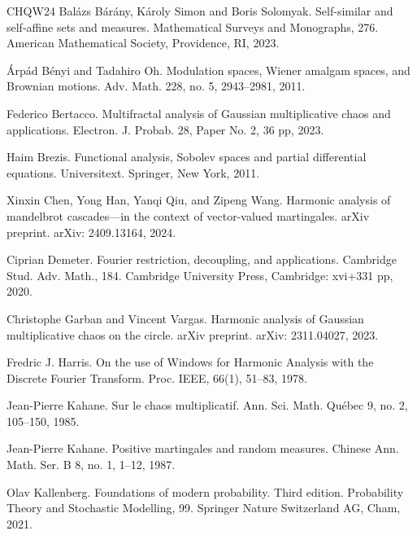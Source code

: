 \documentclass[12pt]{amsart}
\theoremstyle{definition}
\theoremstyle{remark}
\numberwithin{equation}{section}
\begin{document}
\newcommand{\etalchar}[1]{$^{#1}$}
\begin{thebibliography}{CHQW24}
	Bal\'azs B\'ar\'any, K\'aroly Simon and Boris Solomyak.
	\newblock Self-similar and self-affine sets and measures.
	\newblock  Mathematical Surveys and Monographs, 276. American Mathematical Society, Providence, RI, 2023.
	
	\'Arp\'ad B\'enyi and Tadahiro Oh.
	\newblock Modulation spaces, Wiener amalgam spaces, and Brownian motions.
	\newblock Adv. Math. 228, no. 5, 2943--2981, 2011.
	
	
	 Federico Bertacco.
	\newblock Multifractal analysis of Gaussian multiplicative chaos and applications. 
	\newblock Electron. J. Probab. 28, Paper No. 2, 36 pp, 2023.
	 
	Haim Brezis.
	\newblock Functional analysis, Sobolev spaces and partial differential equations.
	\newblock Universitext. Springer, New York, 2011.
	
	Xinxin Chen, Yong Han, Yanqi Qiu, and Zipeng Wang.
	\newblock Harmonic analysis of mandelbrot cascades---in the context of vector-valued martingales.
	\newblock arXiv preprint. arXiv: 2409.13164, 2024.
		
	Ciprian Demeter.
	\newblock Fourier restriction, decoupling, and applications.
	\newblock Cambridge Stud. Adv. Math., 184. Cambridge University Press, Cambridge: xvi+331 pp, 2020.
	
	Christophe Garban and Vincent Vargas.
	\newblock Harmonic analysis of Gaussian multiplicative chaos on the circle.
	\newblock arXiv preprint. arXiv: 2311.04027, 2023.
	
	Fredric J. Harris.
	\newblock On the use of Windows for Harmonic Analysis with the Discrete Fourier Transform. 
	\newblock  Proc. IEEE, 66(1), 51--83, 1978.
	
	 Jean-Pierre Kahane.
	\newblock Sur le chaos multiplicatif.
	\newblock Ann. Sci. Math. Qu\'ebec 9, no. 2, 105--150, 1985. 

	Jean-Pierre Kahane.
	\newblock Positive martingales and random measures.
	\newblock Chinese Ann. Math. Ser. B 8, no. 1, 1--12, 1987.

	Olav Kallenberg.
	\newblock Foundations of modern probability.
	\newblock Third edition.  Probability Theory and Stochastic Modelling, 99. Springer Nature Switzerland AG, Cham, 2021.
	

\end{thebibliography}
\end{document}
